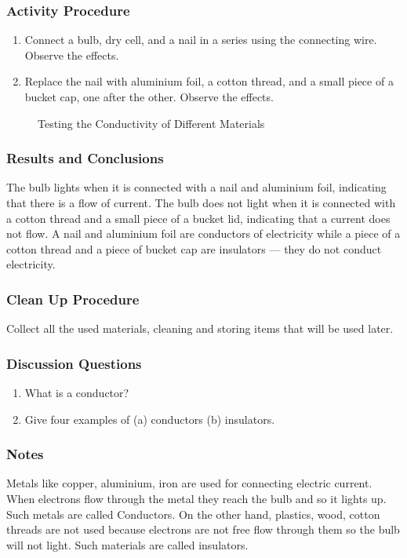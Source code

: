 \subsubsection*{Activity Procedure}
\begin{enumerate}
\item{Connect a bulb, dry cell, and a nail in a series using the connecting wire. Observe the effects.} 
\item{Replace the nail with aluminium foil, a cotton thread, and a small piece of a bucket cap, one after the other. Observe the effects.} 
\end{enumerate}

\begin{figure}
\begin{center}
\def\svgwidth{200pt}

\caption{Testing the Conductivity of Different Materials}
\label{fig:conductors-insulators}
\end{center}
\end{figure}

\subsubsection*{Results and Conclusions}
The bulb lights when it is connected with a nail and aluminium foil, indicating that there is a flow of current. The bulb does not light when it is connected with a cotton thread and a small piece of a bucket lid, indicating that a current does not flow. A nail and aluminium foil are conductors of electricity while a piece of a cotton thread and a piece of bucket cap are insulators --- they do not conduct electricity.

\subsubsection*{Clean Up Procedure}
Collect all the used materials, cleaning and storing items that will be used later.

\subsubsection*{Discussion Questions}
\begin{enumerate}
\item{What is a conductor?}
\item{Give four examples of (a) conductors (b) insulators.} 
\end{enumerate}

\subsubsection*{Notes}
Metals like copper, aluminium, iron are used for connecting electric current. When electrons flow through the metal they reach the bulb and so it lights up. Such metals are called Conductors. On the other hand, plastics, wood, cotton threads are not used because electrons are not free flow through them so the bulb will not light. Such materials are called insulators. 

